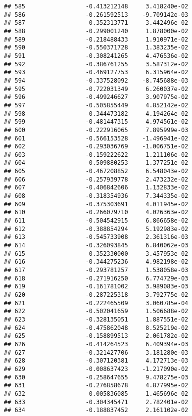 \documentclass[
]{article}
\begin{document}
\begin{verbatim}
## 585                 -0.413212148     3.418240e-02
## 586                 -0.261592513    -9.709142e-03
## 587                 -0.352313771     3.442496e-02
## 588                 -0.299001240     1.878000e-02
## 589                 -0.218488433     1.910971e-02
## 590                 -0.550371728     1.383235e-02
## 591                 -0.308241265     4.476536e-02
## 592                 -0.386761255     3.587312e-02
## 593                 -0.469127753     6.315964e-02
## 594                 -0.337528092    -8.745688e-03
## 595                 -0.722031349     6.260037e-02
## 596                 -0.499246627     3.907975e-02
## 597                 -0.505855449     4.852142e-02
## 598                 -0.344473182     4.194264e-02
## 599                 -0.481447315     4.974561e-02
## 600                 -0.222916065     7.895999e-03
## 601                 -0.566153528    -1.496941e-02
## 602                 -0.293036769    -1.006751e-02
## 603                 -0.159222622     1.211106e-02
## 604                 -0.509880253     1.377251e-02
## 605                 -0.467208852     6.548043e-02
## 606                 -0.257939778     2.473232e-02
## 607                 -0.406842606     1.132833e-02
## 608                 -0.318354936     7.344335e-02
## 609                 -0.375303691     4.011945e-02
## 610                 -0.266079710     4.026363e-02
## 611                 -0.504542915     6.866658e-02
## 612                 -0.388854294     5.192983e-02
## 613                 -0.545733908     2.361316e-03
## 614                 -0.326093845     6.840062e-03
## 615                 -0.352330000     3.457953e-02
## 616                 -0.344275236     4.982198e-02
## 617                 -0.293781257     1.538058e-03
## 618                 -0.271916250     6.774729e-03
## 619                 -0.161781002     3.989083e-03
## 620                 -0.287225318     3.792775e-02
## 621                 -0.222465509     3.060785e-04
## 622                 -0.502041659     1.506688e-02
## 623                 -0.328135051     1.887551e-02
## 624                 -0.475862048     8.525219e-02
## 625                 -0.158899513     2.061782e-02
## 626                 -0.414264523     6.409394e-03
## 627                 -0.321427706     3.181280e-03
## 628                 -0.307120381     4.172713e-03
## 629                 -0.008637423    -1.217090e-02
## 630                 -0.258647655     9.478275e-03
## 631                 -0.276858678     4.877995e-02
## 632                  0.005836085     1.465696e-02
## 633                 -0.304345471     2.782401e-02
## 634                 -0.188837452     2.161102e-02

\end{verbatim}
\end{document}
